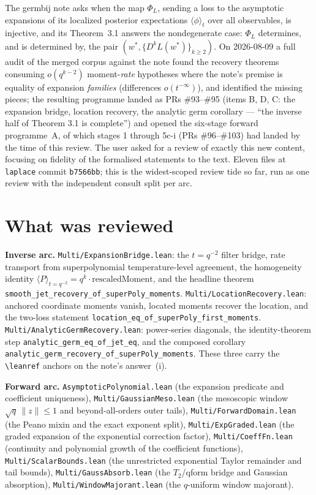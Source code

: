 \documentclass[11pt]{article}
\begin{document}
The germbij note asks when the map $\Phi_L$, sending a loss to the asymptotic
expansions of its localized posterior expectations $\langle\phi\rangle_t$ over
all observables, is injective, and its Theorem~3.1 answers the nondegenerate
case: $\Phi_L$ determines, and is determined by, the pair $(w^*, \{D^k
L(w^*)\}_{k\ge2})$. On 2026-08-09 a full audit of the merged corpus against
the note found the recovery theorems consuming $o(q^{k-2})$ moment-\emph{rate}
hypotheses where the note's premise is equality of expansion \emph{families}
(differences $o(t^{-\infty})$), and identified the missing pieces; the
resulting programme landed as PRs \#93--\#95 (items B, D, C: the expansion
bridge, location recovery, the analytic germ corollary --- ``the inverse half
of Theorem 3.1 is complete'') and opened the six-stage forward programme~A,
of which stages 1 through 5c-i (PRs \#96--\#103) had landed by the time of
this review. The user asked for a review of exactly this new content,
focusing on fidelity of the formalised statements to the text. Eleven files
at \texttt{laplace} commit \texttt{b7566bb}; this is the widest-scoped review
tide so far, run as one review with the independent consult split per arc.

\section{What was reviewed}

\textbf{Inverse arc.} \texttt{Multi/ExpansionBridge.lean}: the $t=q^{-2}$
filter bridge, rate transport from superpolynomial temperature-level
agreement, the homogeneity identity $\langle P\rangle_{t=q^{-2}} = q^k\cdot
\text{rescaledMoment}$, and the headline theorem
\texttt{smooth\_jet\_recovery\_of\_\allowbreak superPoly\_moments}.
\texttt{Multi/LocationRecovery.lean}: anchored coordinate moments vanish,
located moments recover the location, and the two-loss statement
\texttt{location\_eq\_of\_\allowbreak superPoly\_first\_moments}.
\texttt{Multi/AnalyticGermRecovery.lean}: power-series diagonals, the
identity-theorem step \texttt{analytic\_germ\_eq\_of\_jet\_eq}, and the
composed corollary
\texttt{analytic\_germ\_recovery\_of\_\allowbreak superPoly\_moments}. These three carry
the \verb|\leanref| anchors on the note's answer~(i).

\textbf{Forward arc.} \texttt{AsymptoticPolynomial.lean} (the expansion
predicate and coefficient uniqueness), \texttt{Multi/GaussianMeso.lean} (the
mesoscopic window $\sqrt q\,\|z\|\le1$ and beyond-all-orders outer tails),
\texttt{Multi/ForwardDomain.lean} (the Peano mixin and the exact exponent
split), \texttt{Multi/ExpGraded.lean} (the graded expansion of the
exponential correction factor), \texttt{Multi/CoeffFn.lean} (continuity and
polynomial growth of the coefficient functions),
\texttt{Multi/ScalarBounds.lean} (the unrestricted exponential Taylor
remainder and tail bounds), \texttt{Multi/GaussAbsorb.lean} (the $T_2$/qform
bridge and Gaussian absorption), \texttt{Multi/WindowMajorant.lean} (the
$q$-uniform window majorant).
\end{document}
